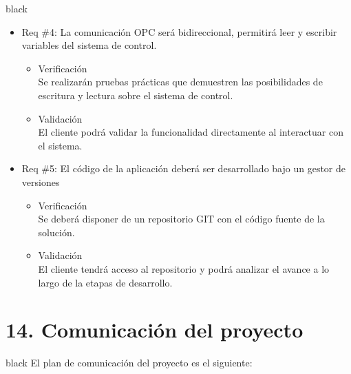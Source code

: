 \documentclass[11pt]{charter}
\begin{document}
\begin{consigna}{black}
\begin{itemize}
\item Req \#4: La comunicación OPC será bidireccional, permitirá leer y escribir variables del sistema de control.

\begin{itemize}
\item Verificación\\
Se realizarán pruebas prácticas que demuestren las posibilidades de escritura y lectura sobre el sistema de control. 
\item Validación\\
El cliente podrá validar la funcionalidad directamente al interactuar con el sistema.
\end{itemize}

\item Req \#5: El código de la aplicación deberá ser desarrollado bajo un gestor de versiones

\begin{itemize}
\item Verificación\\
Se deberá disponer de un repositorio GIT con el código fuente de la solución.
\item Validación\\
El cliente tendrá acceso al repositorio y podrá analizar el avance a lo largo de la etapas de desarrollo.
\end{itemize}
\end{itemize}
\end{consigna}

\section{14. Comunicación del proyecto}
\label{sec:comunicaciones}
\begin{consigna}{black}
El plan de comunicación del proyecto es el siguiente:
\end{consigna}
\end{document}
